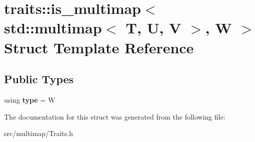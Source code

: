 \hypertarget{structtraits_1_1is__multimap_3_01std_1_1multimap_3_01T_00_01U_00_01V_01_4_00_01W_01_4}{}\section{traits\+:\+:is\+\_\+multimap$<$ std\+:\+:multimap$<$ T, U, V $>$, W $>$ Struct Template Reference}
\label{structtraits_1_1is__multimap_3_01std_1_1multimap_3_01T_00_01U_00_01V_01_4_00_01W_01_4}
\subsection*{Public Types}
\begin{DoxyCompactItemize}
\item 
\mbox{\label{structtraits_1_1is__multimap_3_01std_1_1multimap_3_01T_00_01U_00_01V_01_4_00_01W_01_4_adefac823c1c6f9f58b7e726ea5af6f77}} 
using {\bfseries type} = W
\end{DoxyCompactItemize}


The documentation for this struct was generated from the following file\+:\begin{DoxyCompactItemize}
\item 
src/multimap/Traits.\+h\end{DoxyCompactItemize}
